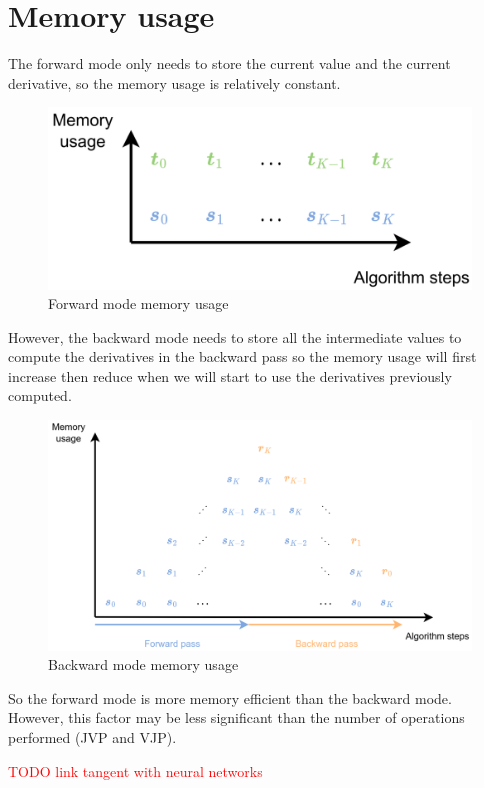 \documentclass[12pt, openany]{report}
\theoremstyle{definition}
\begin{document}
\section{Memory usage}
The forward mode only needs to store the current value and the current derivative, so the memory usage is relatively constant.\\
\begin{figure}[H]
    \centering
    \includegraphics[width=\textwidth]{img/fd_mem.png}
    \caption{Forward mode memory usage}
    \label{fig:fd_mem}
\end{figure}
However, the backward mode needs to store all the intermediate values to compute the derivatives in the backward pass so the memory usage will first increase then reduce when we will start to use the derivatives previously computed.\\
\begin{figure}[H]
    \centering
    \includegraphics[width=\textwidth]{img/bd_mem.png}
    \caption{Backward mode memory usage}
    \label{fig:bd_mem}
\end{figure}
So the forward mode is more memory efficient than the backward mode. However, this factor may be less significant than the number of operations performed (JVP and VJP).

\textcolor{red}{TODO link tangent with neural networks}
\end{document}
